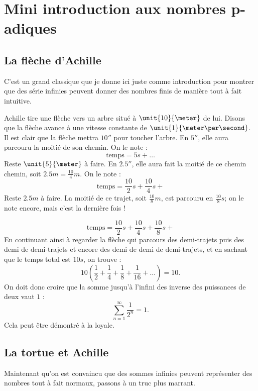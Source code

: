 \section{Mini introduction aux nombres \texorpdfstring{p}{$p$}-adiques}

\subsection{La flèche d'Achille}\label{s:un}

C'est un grand classique que je donne ici juste comme introduction pour montrer que des série infinies peuvent donner des nombres finis de manière tout à fait intuitive.

Achille tire une flèche vers un arbre situé à $\unit{10}{\meter}$ de lui. Disons que la flèche avance à une vitesse constante de $\unit{1}{\meter\per\second}$. Il est clair que la flèche mettra $\unit{10}{\second}$ pour toucher l'arbre. En $\unit{5}{\second}$, elle aura parcouru la moitié de son chemin. On le note :
\[
\text{temps}=5s+\ldots
\]
Reste \( \unit{5}{\meter}\) à faire. En $\unit{2.5}{\second}$, elle aura fait la moitié de ce chemin chemin, soit $2.5m=\frac{10}{4}m$. On le note :
\[
\text{temps}=\frac{10}{2}s+\frac{10}{4}s+
\]
Reste $2.5m$ à faire. La moitié de ce trajet, soit $\frac{10}{8}m$, est parcouru en $\frac{10}{8}s$; on le note encore, mais c'est la dernière fois !

\[
\text{temps}=\frac{10}{2}s+\frac{10}{4}s+\frac{10}{8}s+
\]
En continuant ainsi à regarder la flèche qui parcours des demi-trajets puis des demi de demi-trajets et encore des demi de demi de demi-trajets, et en sachant que le temps total est $10s$, on trouve :
\[
10\left( \frac{1}{2}+\frac{1}{4}+\frac{1}{8}+\frac{1}{16}+\ldots  \right)=10.
\]
On doit donc croire que la somme jusqu'à l'infini des inverse des puissances de deux vaut $1$ :
\[
   \sum_{n=1}^{\infty}\frac{1}{2^n}=1.
\]
Cela peut être démontré à la loyale.

\subsection{La tortue et Achille}

Maintenant qu'on est convaincu que des sommes infinies peuvent représenter des nombres tout à fait normaux, passons à un truc plus marrant.

